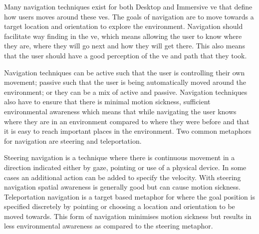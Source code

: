 %
%
%
%
%
%

Many navigation techniques exist for both Desktop and Immersive \acrfull{ve} that define how users moves around these \acrshort{ve}s. The goals of navigation are to move towards a target location and orientation to explore the environment. Navigation should facilitate way finding in the \acrshort{ve}, which means allowing the user to know where they are, where they will go next and how they will get there. This also means that the user should have a good perception of the \acrshort{ve} and path that they took.

Navigation techniques can be active such that the user is controlling their own movement; passive such that the user is being automatically moved around the environment; or they can be a mix of active and passive. Navigation techniques also have to ensure that there is minimal motion sickness, sufficient environmental awareness which means that while navigating the user knows where they are in an environment compared to where they were before and that it is easy to reach important places in the environment. Two common metaphors for navigation are steering and teleportation.

Steering navigation is a technique where there is continuous movement in a direction indicated either by gaze, pointing or use of a physical device. In some cases an additional action can be added to specify the velocity. With steering navigation spatial awareness is generally good but can cause motion sickness. Teleportation navigation is a target based metaphor for where the goal position is specified discretely by pointing or choosing a location and orientation to be moved towards. This form of navigation minimises motion sickness but results in less environmental awareness as compared to the steering metaphor.

